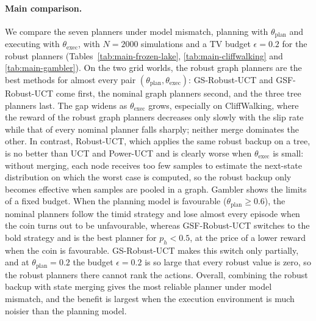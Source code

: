 \paragraph{Main comparison.}
We compare the seven planners under model mismatch, planning with $\theta_{\text{plan}}$ and executing with
$\theta_{\text{exec}}$, with $N = 2000$ simulations and a TV budget $\epsilon = 0.2$ for the robust planners
(Tables~\ref{tab:main-frozen-lake}, \ref{tab:main-cliffwalking} and \ref{tab:main-gambler}). On the two grid worlds,
the robust graph planners are the best methods for almost every pair $(\theta_{\text{plan}}, \theta_{\text{exec}})$:
GS-Robust-UCT and GSF-Robust-UCT come first, the nominal graph planners second, and the three tree planners last. The
gap widens as $\theta_{\text{exec}}$ grows, especially on CliffWalking, where the reward of the robust graph planners
decreases only slowly with the slip rate while that of every nominal planner falls sharply; neither merge dominates the
other. In contrast, Robust-UCT, which applies the same robust
backup on a tree, is no better than UCT and Power-UCT and is clearly
worse when $\theta_{\text{exec}}$ is small: without merging, each node receives too few
samples to estimate the next-state distribution on which the worst case is computed, so the robust backup only becomes
effective when samples are pooled in a graph. Gambler shows the limits of a fixed budget. When the planning model is
favourable ($\theta_{\text{plan}} \ge 0.6$), the nominal planners follow the timid strategy and lose almost every
episode when the coin turns out to be unfavourable, whereas GSF-Robust-UCT switches to the bold strategy and is the best
planner for $p_h < 0.5$, at the price of a lower reward when the coin is favourable. GS-Robust-UCT makes this switch
only partially, and at $\theta_{\text{plan}} = 0.2$ the budget $\epsilon = 0.2$ is so large that every robust value is
zero, so the robust planners there cannot rank the actions. Overall, combining the robust backup with state merging
gives the most reliable planner under model mismatch, and the benefit is largest when the execution environment is
much noisier than the planning model.
